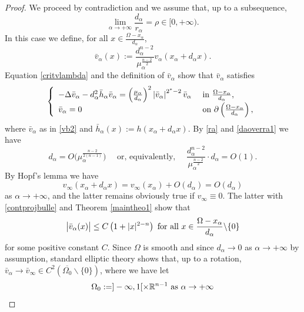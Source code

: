\documentclass[10pt]{amsart}
\numberwithin{equation}{section}
\newcommand{\Om}{\Omega}
\newcommand{\ma}{\mu_\alpha}
\def \rr {\mathbb{R}}
\def \bb{\hbox}
\def \xl{x_\alpha}
\def \ls{+\infty}
\def\la{\alpha}
\def \vb{\bar{v}_{\alpha}}
\def \ma{\mu_{\alpha}}
\def \vo {v_{\infty}}
\def \da{d_{\alpha}}
\def \hb{\bar{h}_{\alpha}}
\theoremstyle{plain}
\theoremstyle{remark}
\begin{document}
\begin{proof} We proceed by contradiction and we assume that, up to a subsequence, 
\begin{equation}\label{daoverra1}
			\lim_{\la\to\ls} \frac{d_{\la}}{r_{\la}}=\rho\in[0,+\infty).
		\end{equation}
		In this case we define, for all $x\in \frac{\Om-\xl}{d_{\la}}$,
		\begin{equation}\label{vb2}
			\vb(x):=\frac{d_{\la}^{n-2}}{\ma^{\frac{n-2}{2}}}v_{\la}(\xl+d_{\la}x). 
		\end{equation}
Equation \eqref{critvlambda} and the definition of $\vb$ show that $\vb$ satisfies
\begin{equation}\label{critvlambdaz}
	\left\{\begin{array}{ll}
		-\Delta\vb -d_{\la}^2\hb \vb=\left(\frac{\ma}{d_{\la}} \right)^2 \left|\vb\right|^{2^*-2}\vb &\hbox{ in } \frac{
			\Om-\xl}{d_{\alpha}}, \\
		\vb= 0  &\hbox{ on } \partial\left(  \frac{
			\Om-\xl}{d_{\alpha}}\right),
	\end{array}\right.
\end{equation}
where $\vb$ as in \eqref{vb2} and $\hb(x):=h(\xl+\da x)$.
By \eqref{ra}  and \eqref{daoverra1} we have 
\begin{equation} \label{condda}
d_{\alpha}=O\Big( \ma^{\frac{n-2}{2(n-1)}}\Big) \quad \text{ or, equivalently, } \quad  \frac{d_\alpha^{n-2}}{\ma^{\frac{n-2}{2}}} \cdot d_\alpha = O(1). 
\end{equation}
By Hopf's lemma we have 
\begin{equation} \label{hopflemma1}
	\vo(\xl+d_{\la}x)= \vo(\xl) + O(d_\alpha) = O(d_\alpha) 
	\end{equation}
as $\alpha \to +\infty$, and the latter remains obviously true if $v_\infty \equiv 0$. The latter with \eqref{contprojbulle} and Theorem \ref{maintheo1} show that 
\begin{equation} \label{eq:contbarva}
	\big|\vb(x) \big| \leq C\left( 1+|x|^{2-n}\right)\bb{ for all } x\in \frac{
		\Om-\xl}{d_{\alpha}} \backslash \{0\}
\end{equation}	
for some positive constant $C$. Since $\Om$ is smooth and since $d_\alpha \to 0$ as $\alpha \to + \infty$ by assumption, standard elliptic theory shows that, up to a rotation,  $\vb \to \bar{v}_{\infty}\in C^2(\overline{\Om_0} \backslash \{0\})$, where we have let 
\begin{equation}\label{defOm0}
		\Om_0:= ]-\infty,1[\times \rr^{n-1} \bb{ as }\alpha\to +\infty

\end{equation}
\end{proof}
\end{document}
